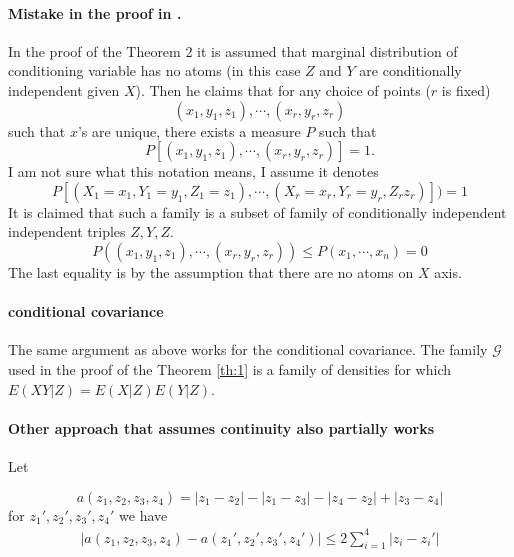 \documentclass{article}
\begin{document}
\paragraph{Mistake in the proof in \cite{bergsma2004testing}.}
In the proof of the Theorem 2 it is assumed that marginal distribution of conditioning variable has no atoms (in this case $Z$ and $Y$ are  conditionally independent given $X$). Then he claims that for any choice of points ($r$ is fixed)
\[ (x_1 , y_1 , z_1 ), \cdots, (x_r , y_r , z_r ) \]  
such that $x$'s are unique, there exists a measure $P$ such that
\[
P[(x_1 , y_1 , z_1 ), \cdots , (x_r , y_r , z_r ) ] =1. 
\]
I am not sure what this notation  means, I assume it denotes 
\[
P[(X_1=x_1 ,Y_1= y_1 , Z_1=z_1 ), \cdots , (X_r = x_r , Y_r= y_r ,Z_r z_r ) ] ) =1
\]
It is claimed that such a family is a subset of family of conditionally independent independent triples $Z,Y,Z$.
\[
P( (x_1 , y_1 , z_1 ), \cdots , (x_r , y_r , z_r ) ) \leq  P(x_1,\cdots,x_n) =0
\]
The last equality is by the assumption that there are no atoms on $X$ axis.


\paragraph{conditional covariance}
The same argument as above works for the conditional covariance. The family $\mathcal G$ used in the proof of the Theorem \ref{th:1} is a family of densities for which $E(XY|Z)=E(X|Z)E(Y|Z)$. 


\paragraph{Other approach that assumes continuity also partially works}
Let 

\[
a(z_1,z_2,z_3,z_4) = |z_1-z_2| - |z_1-z_3| -|z_4-z_2|+|z_3-z_4|  
\]
for $z_1',z_2',z_3',z_4'$ we have 
\begin{align}
|a(z_1,z_2,z_3,z_4) - a(z_1',z_2',z_3',z_4')| \leq 2 \sum_{i=1}^4 |z_i-z_i'| 
\end{align}
\end{document}
